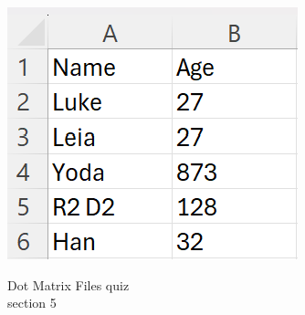 \documentclass{article}
\begin{document}
\begin{enumerate}
		\begin{flushright}
			\includegraphics[scale=.65]{imgs/WritingFamily.PNG}
		\end{flushright}







\end{enumerate}
\pagebreak
Dot Matrix \hfill Files quiz\\
section 5\\
\end{document}

